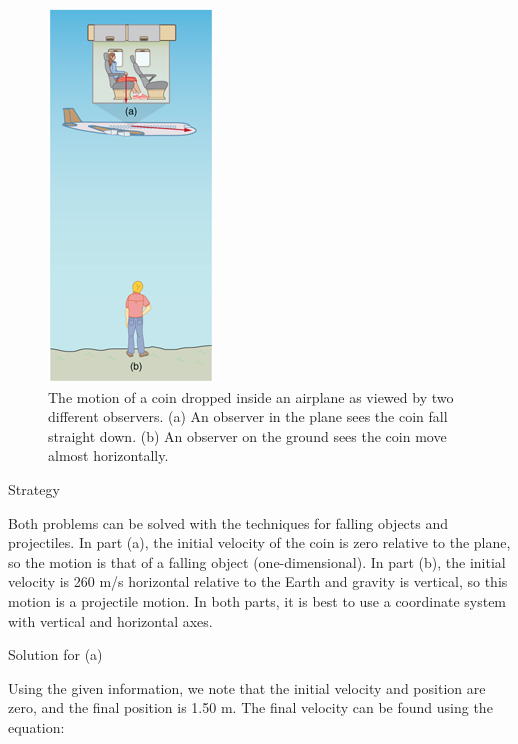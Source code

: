 \documentclass[
]{book}
\newenvironment{tinysection}{}{}
\begin{document}
\begin{figure}
\hypertarget{import-auto-id1944737}{%
\centering
\includegraphics{images/Figure_03_05_06a.jpg}
\caption{The motion of a coin dropped inside an airplane as viewed by two
different observers. (a) An observer in the plane sees the coin fall
straight down. (b) An observer on the ground sees the coin move almost
horizontally.}\label{import-auto-id1944737}
}
\end{figure}

\begin{tinysection}

{Strategy}

\end{tinysection}

Both problems can be solved with the techniques for falling objects and
projectiles. In part (a), the initial velocity of the coin is zero
relative to the plane, so the motion is that of a falling object
(one-dimensional). In part (b), the initial velocity is 260 m/s
horizontal relative to the Earth and gravity is vertical, so this motion
is a projectile motion. In both parts, it is best to use a coordinate
system with vertical and horizontal axes.

\begin{tinysection}

{Solution for (a)}

\end{tinysection}

Using the given information, we note that the initial velocity and
position are zero, and the final position is 1.50 m. The final velocity
can be found using the equation:
\end{document}

